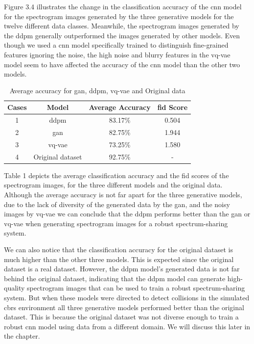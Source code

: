     Figure 3.4 illustrates the change in the classification accuracy of the \gls{cnn} model for the spectrogram images generated by the three generative 
    models for the twelve different data classes. Meanwhile, the spectrogram images generated by the \gls{ddpm} generally outperformed the images generated
    by other models. Even though we used a \gls{cnn} model specifically trained to distinguish fine-grained features ignoring the noise, the high noise and 
    blurry features in the \gls{vq-vae} model seem to have affected the accuracy of the \gls{cnn} model than the other two models. 
    
    
    \begin{table}[h!]
        \centering
        \begin{tabular}{c c c c}
            \hline
            Cases & Model & Average Accuracy & \gls{fid} Score \\
            \hline
            1 & \gls{ddpm} & 83.17\% & 0.504\\
            \hline
            2 & \gls{gan} & 82.75\% & 1.944\\
            \hline
            3 & \gls{vq-vae} & 73.25\%  & 1.580\\
            \hline
            4 & Original dataset & 92.75\%  & - \\
            \hline
        \end{tabular}
        \caption{Average accuracy for \gls{gan}, \gls{ddpm}, \gls{vq-vae} and Original data}
        \label{tab:average_accuracy}
    \end{table}
    
    Table 1 depicts the average classification accuracy and the \gls{fid} scores of the spectrogram images, for the three different models and the original data.
    Although the average accuracy is not far apart for the three generative models, due to the lack of diversity of the generated data by the \gls{gan}, and the noisy
     images by \gls{vq-vae} we can conclude that the \gls{ddpm} performs better than the \gls{gan} or \gls{vq-vae} when generating spectrogram images for a robust 
     spectrum-sharing system.
    
    We can also notice that the classification accuracy for the original dataset is much higher than the other three models. This is expected since the original dataset 
    is a real dataset. However, the \gls{ddpm} model's generated data is not far behind the original dataset, indicating that 
    the \gls{ddpm} model can generate high-quality spectrogram images that can be used to train a robust spectrum-sharing system. But when these models were
    directed to detect collisions in the simulated \gls{cbrs} environment all three generative models performed better than the original dataset. This is because 
    the original dataset was not diverse enough to train a robust \gls{cnn} model using data from a different domain.
    We will discuss this later in the chapter.
    
